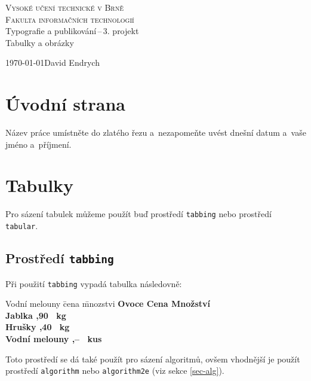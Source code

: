 \documentclass[a4paper,11pt]{article}
\begin{document}
\begin{titlepage}
\begin{center}
\Huge
\textsc{Vysoké učení technické v Brně \\  \huge Fakulta informačních technologií} \\
\LARGE Typografie a publikování\,--\,3. projekt \\
\huge Tabulky a obrázky
\end{center}
{\LARGE \today \hfill David Endrych}
\end{titlepage}
\section{Úvodní strana}
Název práce umístněte do zlatého řezu a~nezapomeňte uvést dnešní datum a~vaše jméno a~příjmení.
\section{Tabulky}
Pro sázení tabulek můžeme použít buď prostředí \texttt{tabbing} nebo prostředí \texttt{tabular}.
\subsection{Prostředí \texttt{tabbing}}
Při použití \texttt{tabbing} vypadá tabulka následovně:
\begin{tabbing}
Vodní melouny \quad \= cena \quad \= mnozstvi \kill
	\bfseries Ovoce \> 
	\bfseries Cena \>
	\bfseries Množství \\ 
	Jablka ,90 ~kg \\
	Hrušky ,40 ~kg \\
	Vodní melouny ,-- ~kus \\
\end{tabbing}
Toto prostředí se dá také použít pro sázení algoritmů, ovšem vhodnější je použít prostředí \texttt{algorithm} nebo \texttt{algorithm2e} (viz sekce \ref{sec-alg}).
\end{document}
